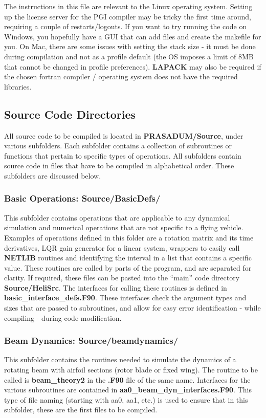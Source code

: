 The instructions in this file are relevant to the Linux operating system. Setting up the license server for the PGI compiler may be tricky the first time around, requiring a couple of restarts/logouts. If you want to try running the code on Windows, you hopefully have a GUI that can add files and create the makefile for you. On Mac, there are some issues with setting the stack size - it must be done during compilation and not as a profile default (the OS imposes a limit of 8MB that cannot be changed in profile preferences). \textbf{LAPACK} may also be required if the chosen fortran compiler / operating system does not have the required libraries.

\subsection{\textbf{Source Code Directories}}
All source code to be compiled is located in \textbf{PRASADUM/Source}, under various subfolders. Each subfolder contains a collection of subroutines or functions that pertain to specific types of operations. All subfolders contain source code in files that have to be compiled in alphabetical order. These subfolders are discussed below.
\subsubsection{Basic Operations: Source/BasicDefs/}
This subfolder contains operations that are applicable to any dynamical simulation and numerical operations that are not specific to a flying vehicle. Examples of operations defined in this folder are a rotation matrix and its time derivatives, LQR gain generator for a linear system, wrappers to easily call \textbf{NETLIB} routines and identifying the interval in a list that contains a specific value. These routines are called by parts of the program, and are separated for clarity. If required, these files can be pasted into the ``main'' code directory \textbf{Source/HeliSrc}. The interfaces for calling these routines is defined in \textbf{basic\_interface\_defs.F90}. These interfaces check the argument types and sizes that are passed to subroutines, and allow for easy error identification - while compiling - during code modification.

\subsubsection{Beam Dynamics: Source/beamdynamics/}
This subfolder contains the routines needed to simulate the dynamics of a rotating beam with airfoil sections (rotor blade or fixed wing). The routine to be called is \textbf{beam\_theory2} in the \textbf{.F90} file of the same name. Interfaces for the various subroutines are contained in \textbf{aa0\_beam\_dyn\_interfaces.F90}. This type of file naming (starting with aa0, aa1, etc.) is used to ensure that in this subfolder, these are the first files to be compiled.


